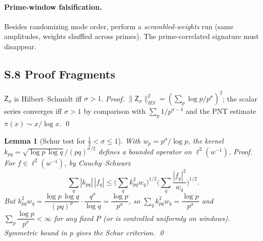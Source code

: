 \documentclass[12]{amsart}
\theoremstyle{plain}
\newtheorem{lemma}[theorem]{Lemma}
\begin{document}
\paragraph{Prime-window falsification.}
Besides randomizing mode order, perform a \emph{scrambled-weights} run (same amplitudes, weights shuffled across primes). The prime-correlated signature must disappear.

\subsection*{S.8 Proof Fragments}

\begin{prop}[HS threshold]\label{prop:hs}
$\mathsf Z_\sigma$ is Hilbert--Schmidt iff $\sigma>1$.
\emph{Proof.}
$\|\mathsf Z_\sigma\|_{HS}^2=(\sum_p \log p/p^\sigma)^2$; the scalar series converges iff $\sigma>1$ by comparison with $\sum_p 1/p^{\sigma-\delta}$ and the PNT estimate $\pi(x)\sim x/\log x$.
\qed
\end{prop}

\begin{lemma}[Schur test for $\tfrac12<\sigma\le 1$]\label{lem:schur}
With $w_p=p^\sigma/\log p$, the kernel $k_{pq}=\sqrt{\log p\,\log q}/(pq)^{\sigma/2}$ defines a bounded operator on $\ell^2(w^{-1})$.
\emph{Proof.}
For $f\in\ell^2(w^{-1})$, by Cauchy–Schwarz
\[
\sum_q |k_{pq}|\,|f_q|
\le \Big(\sum_q k_{pq}^2 w_q\Big)^{1/2}\Big(\sum_q \frac{|f_q|^2}{w_q}\Big)^{1/2}.
\]
But $k_{pq}^2 w_q = \dfrac{\log p\,\log q}{(pq)^\sigma}\cdot\dfrac{q^\sigma}{\log q}=\dfrac{\log p}{p^\sigma}$,
so $\sum_q k_{pq}^2 w_q=\dfrac{\log p}{p^\sigma}$ and $\sum_p \dfrac{\log p}{p^\sigma}<\infty$ for any fixed $P$ (or is controlled uniformly on windows). Symmetric bound in $p$ gives the Schur criterion.
\qed
\end{lemma}



\clearpage
\end{document}
